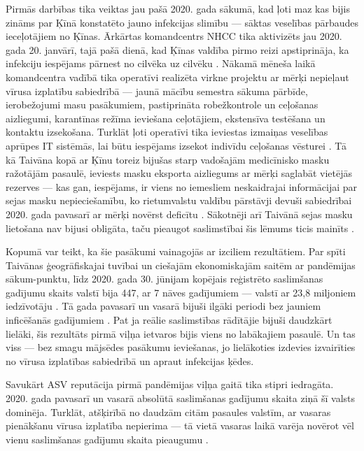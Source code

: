 \documentclass[12pt, a4paper]{article}
\numberwithin{equation}{section} %
\begin{document}
Pirmās darbības tika veiktas jau pašā 2020. gada sākumā, kad ļoti maz kas bijis zināms par Ķīnā konstatēto jauno infekcijas slimību --- sāktas veselības pārbaudes ieceļotājiem no Ķīnas. Ārkārtas komandcentrs NHCC tika aktivizēts jau 2020. gada 20. janvārī, tajā pašā dienā, kad Ķīnas valdība pirmo reizi apstiprināja, ka infekciju iespējams pārnest no cilvēka uz cilvēku \cite{human_human}. Nākamā mēneša laikā komandcentra vadībā tika operatīvi realizēta virkne projektu ar mērķi nepieļaut vīrusa izplatību sabiedrībā --- jaunā mācību semestra sākuma pārbīde, ierobežojumi masu pasākumiem, pastiprināta robežkontrole un ceļošanas aizliegumi, karantīnas režīma ieviešana ceļotājiem, ekstensīva testēšana un kontaktu izsekošana. Turklāt ļoti operatīvi tika ieviestas izmaiņas veselības aprūpes IT sistēmās, lai būtu iespējams izsekot indivīdu ceļošanas vēsturei \cite{wang2020response}. Tā kā Taivāna kopā ar Ķīnu toreiz bijušas starp vadošajām medicīnisko masku ražotājām pasaulē, ieviests masku eksporta aizliegums ar mērķi saglabāt vietējās rezerves \cite{export_ban} --- kas gan, iespējams, ir viens no iemesliem neskaidrajai informācijai par sejas masku nepieciešamību, ko rietumvalstu valdību pārstāvji devuši sabiedrībai 2020. gada pavasarī ar mērķi novērst deficītu \cite{backfired}. Sākotnēji arī Taivānā sejas masku lietošana nav bijusi obligāta, taču pieaugot saslimstībai šis lēmums ticis mainīts \cite{taiwan_mask}. 

Kopumā var teikt, ka šie pasākumi vainagojās ar izciliem rezultātiem. Par spīti Taivānas ģeogrāfiskajai tuvībai un ciešajām ekonomiskajām saitēm ar pandēmijas sākum-punktu, līdz 2020. gada 30. jūnijam kopējais reģistrēto saslimšanas gadījumu skaits valstī bija 447, ar 7 nāves gadījumiem \cite{taiwan_stats} --- valstī ar 23,8 miljoniem iedzīvotāju \cite{taiwan_pop}. Tā gada pavasarī un vasarā bijuši ilgāki periodi bez jauniem inficēšanās gadījumiem \cite{taiwan_zero}. Pat ja reālie saslimstības rādītājie bijuši daudzkārt lielāki, šis rezultāts pirmā viļņa ietvaros bijis viens no labākajiem pasaulē. Un tas viss --- bez smagu mājsēdes pasākumu ieviešanas, jo lielākoties izdevies izvairīties no vīrusa izplatības sabiedrībā un apraut infekcijas ķēdes.

Savukārt ASV reputācija pirmā pandēmijas viļņa gaitā tika stipri iedragāta. 2020. gada pavasarī un vasarā absolūtā saslimšanas gadījumu skaita ziņā šī valsts dominēja. Turklāt, atšķirībā no daudzām citām pasaules valstīm, ar vasaras pienākšanu vīrusa izplatība nepierima --- tā vietā vasaras laikā varēja novērot vēl vienu saslimšanas gadījumu skaita pieaugumu \cite{us_stats}.
\end{document}
